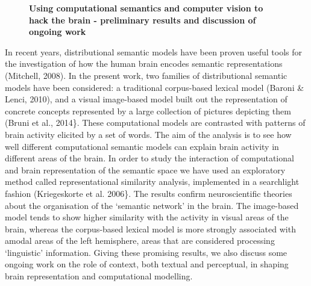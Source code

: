 \documentclass[10pt, a4paper, twopage, headinclude, footinclude, BCOR5mm]{book}
\begin{document}
\newpage

\begin{figure}[t!]
\centering
\large\textbf{Using computational semantics and computer vision to hack the brain - preliminary results and discussion of ongoing work}
\vspace*{0.5cm}
\end{figure}


\begin{table}[t!]
\end{table} 
\noindent
In recent years, distributional semantic models have been proven useful tools for the investigation of how the human brain encodes semantic representations (Mitchell, 2008). In the present work, two families of distributional semantic models have been considered: a traditional corpus-based lexical model (Baroni \& Lenci, 2010), and a visual image-based model built out the representation of concrete concepts represented by a large collection of pictures depicting them (Bruni et al., 2014\}.   These computational models are contrasted with patterns of brain activity elicited by a set of words. The aim of the analysis is to see how well different computational semantic models can explain brain activity in different areas of the brain. In order to study the interaction of computational and brain representation of the semantic space we have used an exploratory method called representational similarity analysis, implemented in a searchlight fashion (Kriegeskorte et al. 2006\}.  The results confirm neuroscientific theories about the organisation of the ‘semantic network’ in the brain. The image-based model tends to show higher similarity with the activity in visual areas of the brain, whereas the corpus-based lexical model is more strongly associated with amodal areas of the left hemisphere, areas that are considered processing ‘linguistic’ information.  Giving these promising results, we also discuss some ongoing work on the role of context, both textual and perceptual, in shaping brain representation and computational modelling.  
\end{document}
